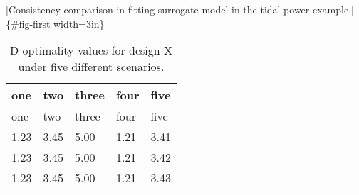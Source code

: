 \documentclass[
  12pt]{article}
\begin{document}
\citep{abr:2008} \citep{gel:kin:1993} \citep{cam:1996}
\citep{bro:cha:1999} \citep{rig:2009} \citep{loc:gel:2010}
\citep{lin:2013} \citep{riz:2023}

{[}Consistency comparison in fitting surrogate model in the tidal power
example.{]}\{\#fig-first width=3in\}

\hypertarget{tbl-one}{}
\begin{longtable}[]{@{}lllll@{}}
\caption{\label{tbl-one}D-optimality values for design X under five
different scenarios.}\tabularnewline
\toprule()
one & two & three & four & five \\
\midrule()
\endfirsthead
\toprule()
one & two & three & four & five \\
\midrule()
\endhead
1.23 & 3.45 & 5.00 & 1.21 & 3.41 \\
1.23 & 3.45 & 5.00 & 1.21 & 3.42 \\
1.23 & 3.45 & 5.00 & 1.21 & 3.43 \\
\bottomrule()
\end{longtable}

\addtolength{\textheight}{.5in}%

\addtolength{\textheight}{-.5in}%


  
\end{document}
